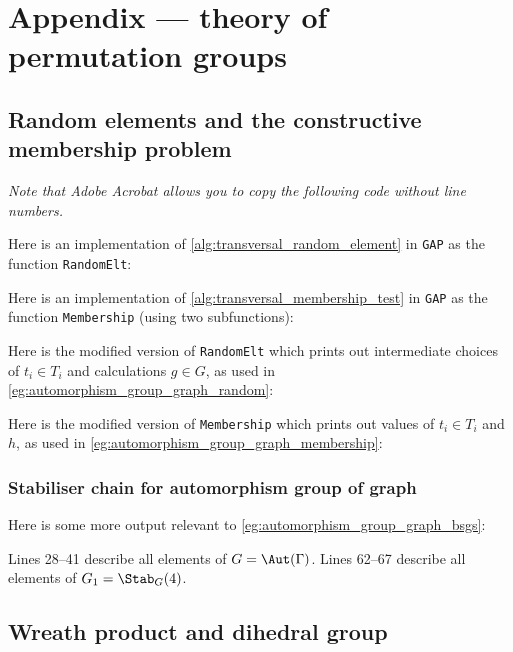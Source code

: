 \chapter{Appendix --- theory of permutation groups}%

\section{Random elements and the constructive membership problem}

\textit{Note that Adobe Acrobat allows you to copy the following code without line numbers.}

Here is an implementation of \autoref{alg:transversal_random_element} in \texttt{GAP} as the function \texttt{RandomElt}:\label{app:transversal_random_element}



Here is an implementation of \autoref{alg:transversal_membership_test} in \texttt{GAP} as the function \texttt{Membership} (using two subfunctions):\label{app:transversal_membership_test}



Here is the modified version of \texttt{RandomElt} which prints out intermediate choices of $t_i \in T_i$ and calculations $g \in G$, as used in \autoref{eg:automorphism_group_graph_random}:



Here is the modified version of \texttt{Membership} which prints out values of $t_i \in T_i$ and $h$, as used in \autoref{eg:automorphism_group_graph_membership}:



\subsection{Stabiliser chain for automorphism group of graph}

Here is some more output relevant to \autoref{eg:automorphism_group_graph_bsgs}:\label{app:automorphism_group_graph_bsgs}



Lines 28--41 describe all elements of $G = \Aut(\Gamma)$. Lines 62--67 describe all elements of $G_1 = \Stab_G(4)$.

\section{Wreath product and dihedral group}

